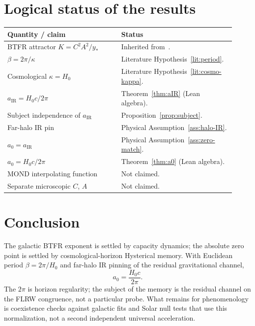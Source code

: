 \documentclass[11pt]{article}
\theoremstyle{definition}
\theoremstyle{remark}
\begin{document}
\section{Logical status of the results}
\label{sec:status}
\begin{center}
\small
\begin{tabular}{@{}p{0.46\linewidth}p{0.46\linewidth}@{}}
\toprule
\textbf{Quantity / claim} & \textbf{Status}\\
\midrule
BTFR attractor $K=C^{2}A^{2}/y_{\ast}$ & Inherited from~\cite{boyd2026galactic}.\\
$\beta=2\pi/\kappa$ & Literature Hypothesis~\ref{lit:period}.\\
Cosmological $\kappa=H_0$ & Literature Hypothesis~\ref{lit:cosmo-kappa}.\\
$a_{\mathrm{IR}}=H_0c/2\pi$ & Theorem~\ref{thm:aIR} (Lean algebra).\\
Subject independence of $a_{\mathrm{IR}}$ & Proposition~\ref{prop:subject}.\\
Far-halo IR pin & Physical Assumption~\ref{ass:halo-IR}.\\
$a_0=a_{\mathrm{IR}}$ & Physical Assumption~\ref{ass:zero-match}.\\
$a_0=H_0c/2\pi$ & Theorem~\ref{thm:a0} (Lean algebra).\\
MOND interpolating function & Not claimed.\\
Separate microscopic $C$, $A$ & Not claimed.\\
\bottomrule
\end{tabular}
\end{center}

\section{Conclusion}
\label{sec:conclusion}
The galactic BTFR exponent is settled by capacity dynamics; the absolute zero point is
settled by cosmological-horizon Hysterical memory.
With Euclidean period $\beta=2\pi/H_0$ and far-halo IR pinning of the residual gravitational
channel,
\[
\boxed{a_0=\frac{H_0c}{2\pi}.}
\]
The $2\pi$ is horizon regularity; the subject of the memory is the residual channel on the
FLRW congruence, not a particular probe.
What remains for phenomenology is coexistence checks against galactic fits and Solar null
tests that use this normalization, not a second independent universal acceleration.



\end{document}
